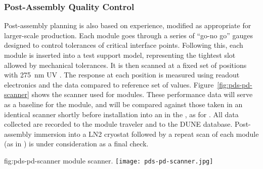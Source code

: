 \subsubsection{Post-Assembly Quality Control}

Post-assembly  planning is also based on  experience, modified as appropriate for larger-scale production.  Each  module goes through a series of ``go-no go'' gauges 
designed to control tolerances of critical interface points.  Following this, each module is inserted into a test  support model, representing the tightest slot allowed by  mechanical tolerances.
It is then scanned at a fixed set of positions with \SI{275}{nm} UV .  
The  response at each position is measured using  readout electronics and the data compared to reference set of values.
Figure~\ref{fig:pds-pd-scanner} shows %
the scanner used for  modules. These performance data will serve as a baseline for the  module, and will be compared against those taken in an identical scanner shortly before installation into an  in the , as for . %
All data collected are recorded to the module traveler and to the DUNE  database.
Post-assembly immersion into a LN2 cryostat followed by a repeat scan of each  module (as in ) is under consideration as a final  check.

\begin{dunefigure}{fig:pds-pd-scanner}
{ module scanner.}
  \texttt{[image: pds-pd-scanner.jpg]}
\end{dunefigure}



